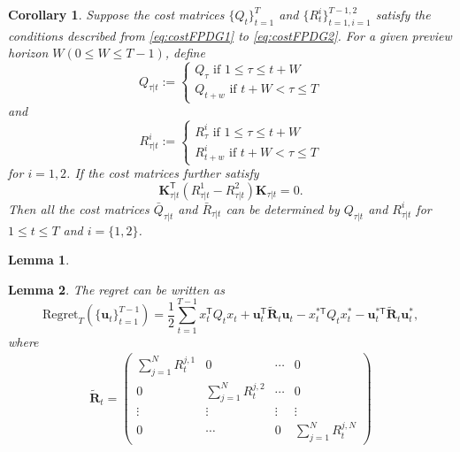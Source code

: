 \documentclass[letterpaper, 10 pt, conference]{ieeeconf}  %
\newcommand{\transpose}{\mathsf{T}}
\newtheorem{lemma}{Lemma}
\newtheorem{corollary}{Corollary}
\begin{document}
\begin{corollary}
    Suppose the cost matrices $\{Q_{t}\}_{t=1}^{T}$ and $\{R_{t}^{i}\}_{t=1,i=1}^{T-1,2}$ satisfy the conditions described from \eqref{eq:costFPDG1} to \eqref{eq:costFPDG2}.
    For a given preview horizon $W(0\leq W \leq T-1)$, define
    \begin{equation}
        Q_{\tau|t}:= 
        \begin{cases}
            Q_{\tau} \text{ if $1\leq \tau \leq t+W$}\\
            Q_{t+w} \text{ if $t+W < \tau \leq T$}
        \end{cases}
    \end{equation}
    and
    \begin{equation}
        R_{\tau|t}^{i}:= 
        \begin{cases}
            R_{\tau}^{i} \text{ if $1\leq \tau \leq t+W$}\\
            R_{t+w}^{i} \text{ if $t+W < \tau \leq T$}
        \end{cases}
    \end{equation}
    for $i = {1,2}$.
    If the cost matrices further satisfy
    \begin{equation}
        \mathbf{K}_{\tau|t}^{\transpose}(R_{\tau|t}^{1}-R_{\tau|t}^{2})\mathbf{K}_{\tau|t} = 0.
    \end{equation}
    Then all the cost matrices $\bar{Q}_{\tau|t}$ and $\bar{R}_{\tau|t}$ can be determined by $Q_{\tau|t}$ and $R_{\tau|t}^{i}$ for $1\leq t \leq T$ and $i = \{1,2\}$.
\end{corollary}

\begin{lemma}
    
\end{lemma}



\begin{lemma}
    The regret can be written as
    \begin{equation}
        \text{Regret}_{T}(\{\mathbf{u}_{t}\}_{t=1}^{T-1}) = \frac{1}{2}\sum_{t=1}^{T-1} x_{t}^{\transpose}Q_{t}x_{t} + \mathbf{u}_{t}^{\transpose}\tilde{\mathbf{R}}_{t}\mathbf{u}_{t} - x_{t}^{*\transpose}Q_{t}x_{t}^{*} - \mathbf{u}_{t}^{*\transpose}\tilde{\mathbf{R}}_{t}\mathbf{u}_{t}^{*},
    \end{equation}
    where 
    \begin{align*}
        \tilde{\mathbf{R}}_{t} = 
        \begin{pmatrix}
            \sum_{j=1}^{N} R_{t}^{j,1} & 0 & \cdots & 0\\
            0 & \sum_{j=1}^{N} R_{t}^{j,2} & \cdots & 0\\
            \vdots& \vdots & \vdots & \vdots\\
            0 & \cdots & 0 & \sum_{j=1}^{N} R_{t}^{j,N}
        \end{pmatrix}
    \end{align*}
\end{lemma}
\end{document}
